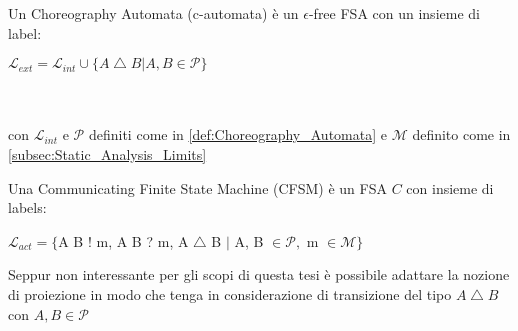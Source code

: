 \begin{definition}
    Un Choreography Automata (c-automata) è un $\epsilon$-free FSA con un insieme di label:\bigskip \\
    \centerline{$\mathcal{L}_{ext} = \mathcal{L}_{int} \cup \{ A \bigtriangleup B | A, B \in \mathcal{P}\}$} \\ \\
    con $\mathcal{L}_{int}$ e $\mathcal{P}$ definiti come in \ref{def:Choreography_Automata} e $\mathcal{M}$ definito come in \ref{subsec:Static_Analysis_Limits}
\end{definition}

\begin{definition}
    Una Communicating Finite State Machine (CFSM) è un FSA $C$ con insieme di labels:
    \bigskip \\
    \centerline{$\mathcal{L}_{act} = \{$A B ! m, A B ? m, A $\bigtriangleup$ B $|$ A, B $ \in \mathcal{P},$ m $ \in \mathcal{M}\}$}
\end{definition}

\begin{remark}
    Seppur non interessante per gli scopi di questa tesi è possibile adattare la nozione di proiezione in modo che tenga in considerazione di transizione del tipo $A \bigtriangleup B$ con $A, B \in \mathcal{P}$
\end{remark}


